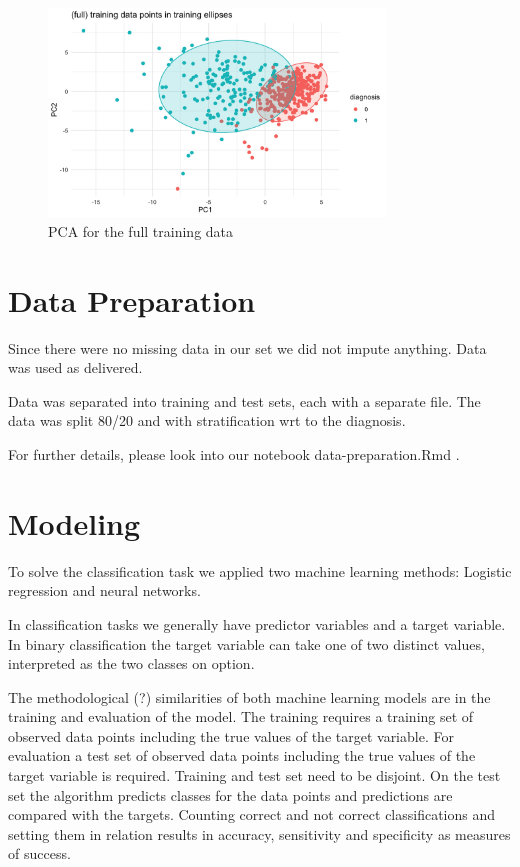\documentclass[]{article}
\begin{document}
\begin{figure}
    \centering
    \includegraphics[width=0.8\textwidth]{images/A-training-full-PCA.png}
    \caption{PCA for the full training data}
    \label{fig:A-training-full-PCA}
\end{figure}

\section{Data Preparation}\label{data-preparation}

Since there were no missing data in our set we did not impute anything.
Data was used as delivered.

Data was separated into training and test sets, each with a separate
file. The data was split 80/20 and with stratification wrt to the
diagnosis.

For further details, please look into our notebook data-preparation.Rmd
.

\section{Modeling}\label{modeling}

To solve the classification task we applied two machine learning
methods: Logistic regression and neural networks.

In classification tasks we generally have predictor variables and a
target variable. In binary classification the target variable can take
one of two distinct values, interpreted as the two classes on option.

The methodological (?) similarities of both machine learning models are
in the training and evaluation of the model. The training requires a
training set of observed data points including the true values of the
target variable. For evaluation a test set of observed data points
including the true values of the target variable is required. Training
and test set need to be disjoint. On the test set the algorithm predicts
classes for the data points and predictions are compared with the
targets. Counting correct and not correct classifications and setting
them in relation results in accuracy, sensitivity and specificity as
measures of success.
\end{document}
